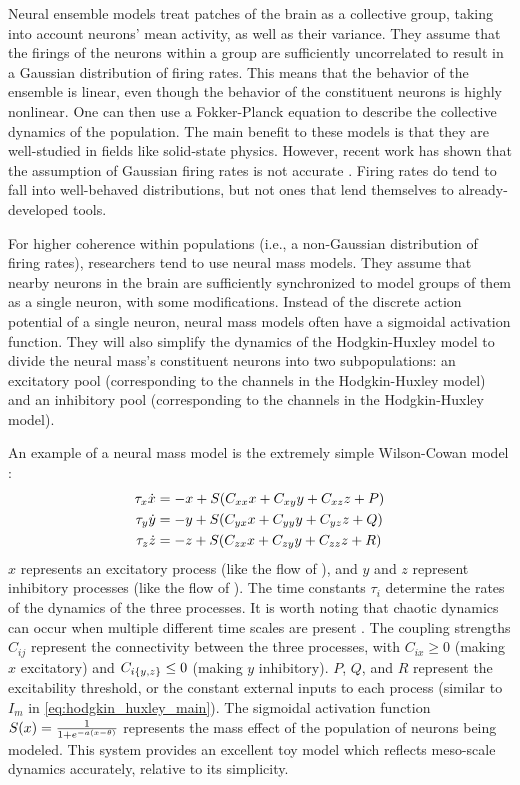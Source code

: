 Neural ensemble models treat patches of the brain as a collective group, taking into account neurons' mean activity, as well as their variance.
They assume that the firings of the neurons within a group are sufficiently uncorrelated to result in a Gaussian distribution of firing rates.
This means that the behavior of the ensemble is linear, even though the behavior of the constituent neurons is highly nonlinear.
One can then use a Fokker-Planck equation to describe the collective dynamics of the population.
The main benefit to these models is that they are well-studied in fields like solid-state physics.
However, recent work has shown that the assumption of Gaussian firing rates is not accurate \cite{Breakspear2017}.
Firing rates do tend to fall into well-behaved distributions, but not ones that lend themselves to already-developed tools.

For higher coherence within populations (i.e., a non-Gaussian distribution of firing rates), researchers tend to use neural mass models.
They assume that nearby neurons in the brain are sufficiently synchronized to model groups of them as a single neuron, with some modifications.
Instead of the discrete action potential of a single neuron, neural mass models often have a sigmoidal activation function.
They will also simplify the dynamics of the Hodgkin-Huxley model to divide the neural mass's constituent neurons into two subpopulations: an excitatory pool (corresponding to the  channels in the Hodgkin-Huxley model) and an inhibitory pool (corresponding to the  channels in the Hodgkin-Huxley model).

An example of a neural mass model is the extremely simple Wilson-Cowan model \cite{Wang2012}:
\begin{align}
  \label{eq:wc_x}
  \tau_{x} \dot{x}
  &=
    -x + S \pqty{C_{x x} x + C_{x y} y + C_{x z} z + P} \\
  \label{eq:wc_y}
  \tau_{y} \dot{y}
  &=
    -y + S \pqty{C_{y x} x + C_{y y} y + C_{y z} z + Q} \\
  \label{eq:wc_z}
  \tau_{z} \dot{z}
  &=
    -z + S \pqty{C_{z x} x + C_{z y} y + C_{z z} z + R}
\end{align}
$x$ represents an excitatory process (like the flow of ), and $y$ and $z$ represent inhibitory processes (like the flow of ).
The time constants $\tau_{i}$ determine the rates of the dynamics of the three processes.
It is worth noting that chaotic dynamics can occur when multiple different time scales are present \cite{Breakspear2017}.
The coupling strengths $C_{i j}$ represent the connectivity between the three processes, with $C_{i x} \geq 0$ (making $x$ excitatory) and $C_{i \Bqty{y, z}} \leq 0$ (making $y$ inhibitory).
$P$, $Q$, and $R$ represent the excitability threshold, or the constant external inputs to each process (similar to $I_{m}$ in \cref{eq:hodgkin_huxley_main}).
The sigmoidal activation function $S(x) = \frac{1}{1 + e^{-a \pqty{x - \theta}}}$ represents the mass effect of the population of neurons being modeled.
This system provides an excellent toy model which reflects meso-scale dynamics accurately, relative to its simplicity.

